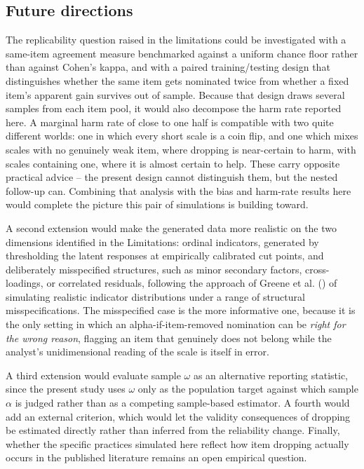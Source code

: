 \documentclass[
  nonatbib,
  authoryear,
  preprint]{elsarticle}
\begin{document}
\subsection{Future directions}\label{future-directions}

The replicability question raised in the limitations could be
investigated with a same-item agreement measure benchmarked against a
uniform chance floor rather than against Cohen's kappa, and with a
paired training/testing design that distinguishes whether the same item
gets nominated twice from whether a fixed item's apparent gain survives
out of sample. Because that design draws several samples from each item
pool, it would also decompose the harm rate reported here. A marginal
harm rate of close to one half is compatible with two quite different
worlds: one in which every short scale is a coin flip, and one which
mixes scales with no genuinely weak item, where dropping is near-certain
to harm, with scales containing one, where it is almost certain to help.
These carry opposite practical advice -- the present design cannot
distinguish them, but the nested follow-up can. Combining that analysis
with the bias and harm-rate results here would complete the picture this
pair of simulations is building toward.

A second extension would make the generated data more realistic on the
two dimensions identified in the Limitations: ordinal indicators,
generated by thresholding the latent responses at empirically calibrated
cut points, and deliberately misspecified structures, such as minor
secondary factors, cross-loadings, or correlated residuals, following
the approach of Greene et al. () of
simulating realistic indicator distributions under a range of structural
misspecifications. The misspecified case is the more informative one,
because it is the only setting in which an alpha-if-item-removed
nomination can be \emph{right for the wrong reason}, flagging an item
that genuinely does not belong while the analyst's unidimensional
reading of the scale is itself in error.

A third extension would evaluate sample \(\omega\) as an alternative
reporting statistic, since the present study uses \(\omega\) only as the
population target against which sample \(\alpha\) is judged rather than
as a competing sample-based estimator. A fourth would add an external
criterion, which would let the validity consequences of dropping be
estimated directly rather than inferred from the reliability change.
Finally, whether the specific practices simulated here reflect how item
dropping actually occurs in the published literature remains an open
empirical question.
\end{document}
